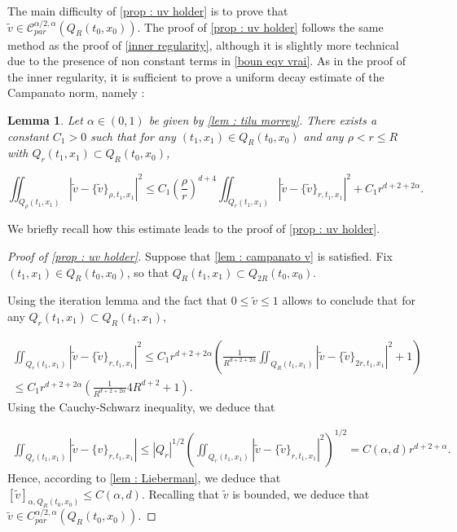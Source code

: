 \documentclass[reqno,12pt,twoside]{amsart}
\newtheorem{lemma}{Lemma}[section]
\numberwithin{equation}{section} \numberwithin{theorem}{section}
\numberwithin{proposition}{section} \numberwithin{lemma}{section}
\numberwithin{corollary}{section}
\numberwithin{definition}{section} \numberwithin{remark}{section}
\begin{document}
%
The main difficulty of \autoref{prop : uv holder} is to prove that $\widetilde{v}\in \mathcal{C}_{par}^{\alpha/2,\alpha}(Q_R(t_0, x_0))$.
The proof of \autoref{prop : uv holder} follows the same method as the proof of \autoref{inner regularity}, although it is slightly more technical due to the presence of non constant terms in \eqref{boun eqv vrai}.
As in the proof of the inner regularity, it is sufficient to prove a uniform decay estimate of the Campanato norm, namely : 
\begin{lemma}\label{lem : campanato v}
Let $\alpha\in (0,1)$ be given by \autoref{lem : tilu morrey}. There exists a constant $C_1 > 0$ such that for any $(t_1, x_1) \in Q_R(t_0,x_0)$ and any $\rho < r \leqslant R$ with $Q_r(t_1, x_1) \subset Q_R (t_0,x_0)$, 

\[\iint_{Q_\rho(t_1,x_1)} |\widetilde{v} - \{\widetilde{v}\}_{\rho,t_1,x_1}|^2 \leqslant C_1\left(\frac{\rho}{r}\right)^{d+4} \iint_{Q_{r}(t_1,x_1)} |\widetilde{v} - \{\widetilde{v}\}_{r, t_1, x_1}|^2 + C_1r^{d+2 +2\alpha}.\]
\end{lemma}

We briefly recall how this estimate leads to the proof of \autoref{prop : uv holder}. 

\begin{proof}[Proof of \autoref{prop : uv holder}]
Suppose that \autoref{lem : campanato v} is satisfied. Fix $(t_1,x_1) \in Q_R(t_0,x_0)$, so that $Q_R(t_1, x_1) \subset Q_{2R}(t_0,x_0)$. 

Using the iteration lemma \cite[Lemma 4.6]{L96} and the fact that $0\leqslant \widetilde{v} \leqslant 1$ allows to conclude that for any $Q_r(t_1, x_1) \subset Q_R(t_1,x_1)$, 

\begin{multline*}
\iint_{Q_r(t_1,x_1)} |\widetilde{v} - \{\widetilde{v}\}_{r,t_1,x_1}|^2\leqslant C_1 r^{d+2+2\alpha} \left(\frac{1}{R^{d+2+2\alpha}}\iint_{Q_{R}(t_1,x_1)} |\widetilde{v} - \{\widetilde{v}\}_{2r,t_1,x_1}|^2 + 1\right)\\
\leqslant C_1 r^{d+2+2\alpha} \left(\frac{1}{R^{d+2+2\alpha}}4R^{d+2} + 1\right).
\end{multline*}
Using the Cauchy-Schwarz inequality, we deduce that 

\begin{multline*}
\iint_{Q_r (t_1,x_1)} |\widetilde{v} - \{v\}_{r,t_1,x_1}| \leqslant |Q_r|^{1/2} \left(\iint_{Q_r(t_1, x_1)} |\widetilde{v} - \{\widetilde{v}\}_{r,t_1,x_1}|^2\right)^{1/2}= C(\alpha, d) r^{d+2+\alpha}.
\end{multline*}
Hence, according to \autoref{lem : Lieberman}, we deduce that $[\widetilde{v}]_{\alpha, Q_R(t_0, x_0)} \leqslant C(\alpha ,d)$. Recalling that $\widetilde{v}$ is bounded, we deduce that $\widetilde{v} \in C_{par}^{\alpha/2, \alpha} (Q_R(t_0, x_0))$. 
\end{proof}
\end{document}
